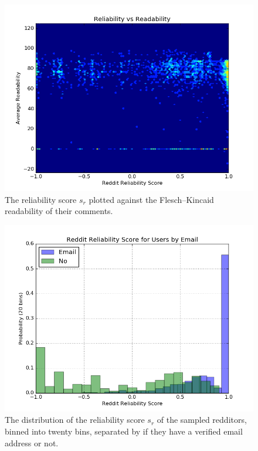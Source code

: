 \begin{figure}[tb]
    \centering
    \includegraphics[width=\linewidth]{figures/reliability_readability.png}
    \caption{The reliability score $s_r$ plotted against the Flesch--Kincaid readability of their comments.}
    \label{fig:reliability_readability}
\end{figure}

\begin{figure}[tb]
    \centering
    \includegraphics[width=\linewidth]{figures/data_20_email.png}
    \caption{The distribution of the reliability score $s_r$ of the sampled redditors, binned into twenty bins, separated by if they have a verified email address or not.}
    \label{fig:data_20_email}
\end{figure}
